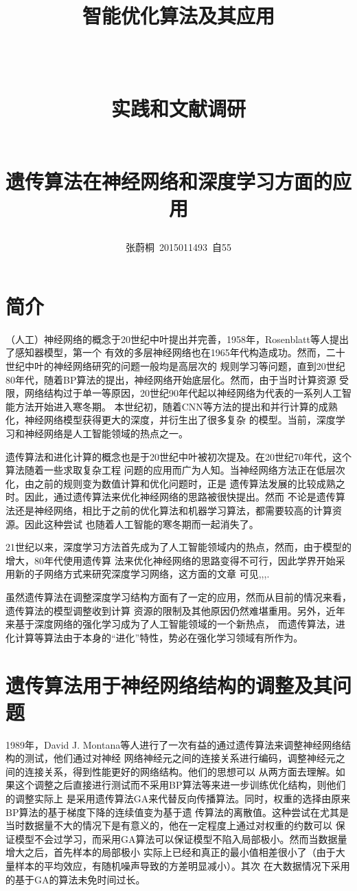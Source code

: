 \documentclass[UTF8,a4paper]{paper}
\title{
    \begin{large} 智能优化算法及其应用\end{large}
\\  \begin{large} 实践和文献调研\end{large}
\\ 遗传算法在神经网络和深度学习方面的应用}
\author{张蔚桐\ 2015011493\ 自55}
\begin{document}

\maketitle
{}
\section{简介}
（人工）神经网络的概念于20世纪中叶提出并完善，1958年，Rosenblatt等人提出了感知器模型，第一个
有效的多层神经网络也在1965年代构造成功。然而，二十世纪中叶的神经网络研究的问题一般均是高层次的
规则学习等问题，直到20世纪80年代，随着BP算法的提出，神经网络开始底层化。然而，由于当时计算资源
受限，网络结构过于单一等原因，20世纪90年代起以神经网络为代表的一系列人工智能方法开始进入寒冬期。
本世纪初，随着CNN等方法的提出和并行计算的成熟化，神经网络模型获得更大的深度，并衍生出了很多复杂
的模型。当前，深度学习和神经网络是人工智能领域的热点之一。

遗传算法和进化计算的概念也是于20世纪中叶被初次提及。在20世纪70年代，这个算法随着一些求取复杂工程
问题的应用而广为人知。当神经网络方法正在低层次化，由之前的规则变为数值计算和优化问题时，正是
遗传算法发展的比较成熟之时。因此，通过遗传算法来优化神经网络的思路被很快提出\cite{Oldest}。然而
不论是遗传算法还是神经网络，相比于之前的优化算法和机器学习算法，都需要较高的计算资源。因此这种尝试
也随着人工智能的寒冬期而一起消失了。

21世纪以来，深度学习方法首先成为了人工智能领域内的热点，然而，由于模型的增大，80年代使用遗传算
法来优化神经网络的思路变得不可行，因此学界开始采用新的子网络方式来研究深度学习网络，这方面的文章
可见\cite{DLUGA},\cite{1703.01513},\cite{1703.00548},\cite{Tuning}.

虽然遗传算法在调整深度学习结构方面有了一定的应用，然而从目前的情况来看，遗传算法的模型调整收到计算
资源的限制及其他原因仍然难堪重用。另外，近年来基于深度网络的强化学习成为了人工智能领域的一个新热点，
而遗传算法，进化计算等算法由于本身的“进化”特性，势必在强化学习领域有所作为。
\section{遗传算法用于神经网络结构的调整及其问题}
1989年，David J. Montana等人进行了一次有益的通过遗传算法来调整神经网络结构的测试，他们通过对神经
网络神经元之间的连接关系进行编码，调整神经元之间的连接关系，得到性能更好的网络结构。他们的思想可以
从两方面去理解。如果这个调整之后直接进行测试而不采用BP算法等来进一步训练优化结构，则他们的调整实际上
是采用遗传算法GA来代替反向传播算法。同时，权重的选择由原来BP算法的基于梯度下降的连续值变为基于遗
传算法的离散值。这种尝试在尤其是当时数据量不大的情况下是有意义的，他在一定程度上通过对权重的约数可以
保证模型不会过学习，而采用GA算法可以保证模型不陷入局部极小。然而当数据量增大之后，首先样本的局部极小
实际上已经和真正的最小值相差很小了（由于大量样本的平均效应，有随机噪声导致的方差明显减小）。其次
在大数据情况下采用的基于GA的算法未免时间过长。
\end{document}
